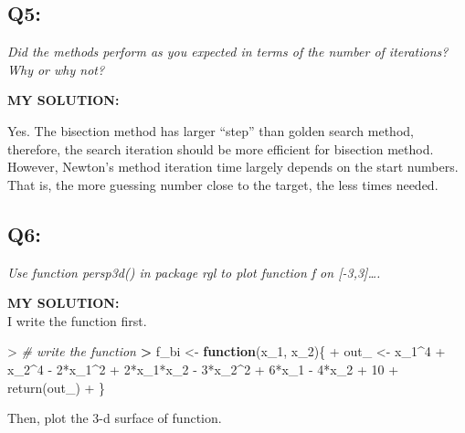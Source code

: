\documentclass[
]{article}
\newenvironment{Shaded}{\begin{snugshade}}{\end{snugshade}}
\newcommand{\CommentTok}[1]{\textcolor[rgb]{0.56,0.35,0.01}{\textit{#1}}}
\newcommand{\ControlFlowTok}[1]{\textcolor[rgb]{0.13,0.29,0.53}{\textbf{#1}}}
\newcommand{\DecValTok}[1]{\textcolor[rgb]{0.00,0.00,0.81}{#1}}
\newcommand{\ErrorTok}[1]{\textcolor[rgb]{0.64,0.00,0.00}{\textbf{#1}}}
\newcommand{\FunctionTok}[1]{\textcolor[rgb]{0.00,0.00,0.00}{#1}}
\newcommand{\NormalTok}[1]{#1}
\newcommand{\OtherTok}[1]{\textcolor[rgb]{0.56,0.35,0.01}{#1}}
\newcommand{\SpecialCharTok}[1]{\textcolor[rgb]{0.00,0.00,0.00}{#1}}
\begin{document}
\hypertarget{q5}{%
\subsection{Q5:}\label{q5}}

\emph{Did the methods perform as you expected in terms of the number of
iterations? Why or why not?}

\textbf{MY SOLUTION:}

Yes. The bisection method has larger ``step'' than golden search method,
therefore, the search iteration should be more efficient for bisection
method. However, Newton's method iteration time largely depends on the
start numbers. That is, the more guessing number close to the target,
the less times needed.

\hypertarget{q6}{%
\subsection{Q6:}\label{q6}}

\emph{Use function persp3d() in package rgl to plot function f on
{[}-3,3{]}\ldots.}

\textbf{MY SOLUTION:}\\
I write the function first.

\begin{Shaded}
\begin{Highlighting}[]
\SpecialCharTok{\textgreater{}} \CommentTok{\# write the function}
\ErrorTok{\textgreater{}}\NormalTok{ f\_bi }\OtherTok{\textless{}{-}} \ControlFlowTok{function}\NormalTok{(x\_1, x\_2)\{}
\SpecialCharTok{+}\NormalTok{   out\_ }\OtherTok{\textless{}{-}}\NormalTok{ x\_1}\SpecialCharTok{\^{}}\DecValTok{4} \SpecialCharTok{+}\NormalTok{ x\_2}\SpecialCharTok{\^{}}\DecValTok{4} \SpecialCharTok{{-}} \DecValTok{2}\SpecialCharTok{*}\NormalTok{x\_1}\SpecialCharTok{\^{}}\DecValTok{2} \SpecialCharTok{+} \DecValTok{2}\SpecialCharTok{*}\NormalTok{x\_1}\SpecialCharTok{*}\NormalTok{x\_2 }\SpecialCharTok{{-}} \DecValTok{3}\SpecialCharTok{*}\NormalTok{x\_2}\SpecialCharTok{\^{}}\DecValTok{2} \SpecialCharTok{+} \DecValTok{6}\SpecialCharTok{*}\NormalTok{x\_1 }\SpecialCharTok{{-}} \DecValTok{4}\SpecialCharTok{*}\NormalTok{x\_2 }\SpecialCharTok{+} \DecValTok{10}
\SpecialCharTok{+}   \FunctionTok{return}\NormalTok{(out\_)}
\SpecialCharTok{+}\NormalTok{ \}}
\end{Highlighting}
\end{Shaded}

Then, plot the 3-d surface of function.
\end{document}
